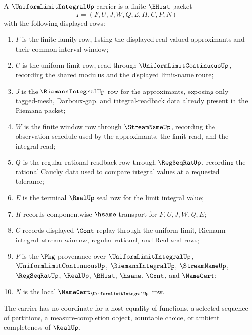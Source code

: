\begin{definition}
\label{def:uniform-limit-integral-carrier}
A $\UniformLimitIntegralUp$ carrier is a finite $\BHist$ packet
$$
I=(F,U,J,W,Q,E,H,C,P,N)
$$
with the following displayed rows:
\begin{enumerate}
\item $F$ is the finite family row, listing the displayed real-valued approximants and their common interval window;
\item $U$ is the uniform-limit row, read through $\UniformLimitContinuousUp$, recording the shared modulus and the displayed limit-name route;
\item $J$ is the $\RiemannIntegralUp$ row for the approximants, exposing only tagged-mesh, Darboux-gap, and integral-readback data already present in the Riemann packet;
\item $W$ is the finite window row through $\StreamNameUp$, recording the observation schedule used by the approximants, the limit read, and the integral read;
\item $Q$ is the regular rational readback row through $\RegSeqRatUp$, recording the rational Cauchy data used to compare integral values at a requested tolerance;
\item $E$ is the terminal $\RealUp$ seal row for the limit integral value;
\item $H$ records componentwise $\hsame$ transport for $F,U,J,W,Q,E$;
\item $C$ records displayed $\Cont$ replay through the uniform-limit, Riemann-integral, stream-window, regular-rational, and Real-seal rows;
\item $P$ is the $\Pkg$ provenance over $\UniformLimitIntegralUp$, $\UniformLimitContinuousUp$, $\RiemannIntegralUp$, $\StreamNameUp$, $\RegSeqRatUp$, $\RealUp$, $\BHist$, $\hsame$, $\Cont$, and $\NameCert$;
\item $N$ is the local $\NameCert_{\UniformLimitIntegralUp}$ row.
\end{enumerate}
The carrier has no coordinate for a host equality of functions, a selected sequence of partitions, a measure-completion object, countable choice, or ambient completeness of $\RealUp$.
\end{definition}

